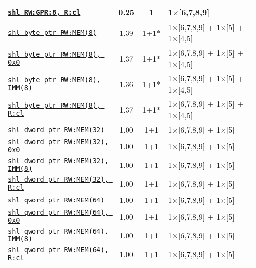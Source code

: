 \documentclass[a4paper,english,fontsize=9]{scrartcl}
\begin{document}
\begin{longtable}{p{}ccL{.25\textwidth}}
  \midrule
  \texttt{\href{https://felixcloutier.com/x86/SAL:SAR:SHL:SHR.html}{shl RW:GPR:8, R:cl}} & 0.25 & 1 & 1\(\times\)[6,7,8,9] \\
  \midrule
  \texttt{\href{https://felixcloutier.com/x86/SAL:SAR:SHL:SHR.html}{shl byte ptr RW:MEM(8)}} & 1.39 & 1+1* & 1\(\times\)[6,7,8,9] + 1\(\times\)[5] + 1\(\times\)[4,5] \\
  \midrule
  \texttt{\href{https://felixcloutier.com/x86/SAL:SAR:SHL:SHR.html}{shl byte ptr RW:MEM(8), 0x0}} & 1.37 & 1+1* & 1\(\times\)[6,7,8,9] + 1\(\times\)[5] + 1\(\times\)[4,5] \\
  \midrule
  \texttt{\href{https://felixcloutier.com/x86/SAL:SAR:SHL:SHR.html}{shl byte ptr RW:MEM(8), IMM(8)}} & 1.36 & 1+1* & 1\(\times\)[6,7,8,9] + 1\(\times\)[5] + 1\(\times\)[4,5] \\
  \midrule
  \texttt{\href{https://felixcloutier.com/x86/SAL:SAR:SHL:SHR.html}{shl byte ptr RW:MEM(8), R:cl}} & 1.37 & 1+1* & 1\(\times\)[6,7,8,9] + 1\(\times\)[5] + 1\(\times\)[4,5] \\
  \midrule
  \texttt{\href{https://felixcloutier.com/x86/SAL:SAR:SHL:SHR.html}{shl dword ptr RW:MEM(32)}} & 1.00 & 1+1 & 1\(\times\)[6,7,8,9] + 1\(\times\)[5] \\
  \midrule
  \texttt{\href{https://felixcloutier.com/x86/SAL:SAR:SHL:SHR.html}{shl dword ptr RW:MEM(32), 0x0}} & 1.00 & 1+1 & 1\(\times\)[6,7,8,9] + 1\(\times\)[5] \\
  \midrule
  \texttt{\href{https://felixcloutier.com/x86/SAL:SAR:SHL:SHR.html}{shl dword ptr RW:MEM(32), IMM(8)}} & 1.00 & 1+1 & 1\(\times\)[6,7,8,9] + 1\(\times\)[5] \\
  \midrule
  \texttt{\href{https://felixcloutier.com/x86/SAL:SAR:SHL:SHR.html}{shl dword ptr RW:MEM(32), R:cl}} & 1.00 & 1+1 & 1\(\times\)[6,7,8,9] + 1\(\times\)[5] \\
  \midrule
  \texttt{\href{https://felixcloutier.com/x86/SAL:SAR:SHL:SHR.html}{shl qword ptr RW:MEM(64)}} & 1.00 & 1+1 & 1\(\times\)[6,7,8,9] + 1\(\times\)[5] \\
  \midrule
  \texttt{\href{https://felixcloutier.com/x86/SAL:SAR:SHL:SHR.html}{shl qword ptr RW:MEM(64), 0x0}} & 1.00 & 1+1 & 1\(\times\)[6,7,8,9] + 1\(\times\)[5] \\
  \midrule
  \texttt{\href{https://felixcloutier.com/x86/SAL:SAR:SHL:SHR.html}{shl qword ptr RW:MEM(64), IMM(8)}} & 1.00 & 1+1 & 1\(\times\)[6,7,8,9] + 1\(\times\)[5] \\
  \midrule
  \texttt{\href{https://felixcloutier.com/x86/SAL:SAR:SHL:SHR.html}{shl qword ptr RW:MEM(64), R:cl}} & 1.00 & 1+1 & 1\(\times\)[6,7,8,9] + 1\(\times\)[5] \\

\end{longtable}
\end{document}
